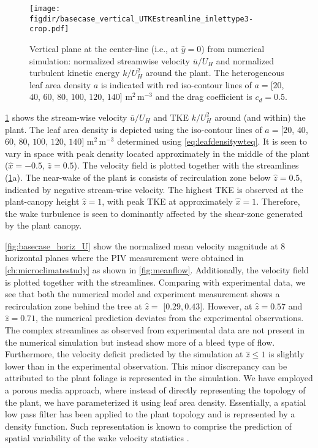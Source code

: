 	

\begin{figure}[h]
	\centering
	\texttt{[image: \\figdir/basecase\_vertical\_UTKEstreamline\_inlettype3-crop.pdf]}
	\caption{Vertical plane at the center-line (i.e., at $\hat{y}=0$) from numerical simulation:  normalized  streamwise velocity $\overline{u}/U_H$ and  normalized  turbulent kinetic energy $k/U_H^2$ around the plant. The heterogeneous leaf area density $a$ is indicated with red iso-contour lines of $a = [20$, $40$, $60$, $80$, $100$, $120$, $140]$ m$^2$\,m$^{-3}$ and the drag coefficient is $c_d=0.5$.}
	\label{fig:basecase_vertical_UTKEstreamline}
\end{figure}

\cref{fig:basecase_vertical_UTKEstreamline} shows the stream-wise velocity $\overline{u}/U_H$ and TKE $k/U_H^2$ around (and within) the plant. The leaf area density is depicted using the iso-contour lines of $a = [20$, $40$, $60$, $80$, $100$, $120$, $140]$ m$^2$\,m$^{-3}$ determined using \cref{eq:leafdensitywteq}. It is seen to vary in space with peak density located approximately in the middle of the plant ($\hat{x}=-0.5$, $\hat{z}=0.5$). The velocity field is plotted together with the streamlines (\cref{fig:basecase_vertical_UTKEstreamline}a). The near-wake of the plant is consists of recirculation zone below $\hat{z} = 0.5$, indicated by negative stream-wise velocity. The highest TKE is observed at the plant-canopy height $\hat{z} = 1$, with peak TKE at approximately $\hat{x} = 1$. Therefore, the wake turbulence is seen to dominantly affected by the shear-zone generated by the plant canopy.

\cref{fig:basecase_horiz_U} show the normalized mean velocity magnitude at 8 horizontal planes where the PIV measurement were obtained in \cref{ch:microclimatestudy} as shown in \cref{fig:meanflow}. Additionally, the velocity field is plotted together with the streamlines. Comparing with experimental data, we see that both the numerical model and experiment measurement shows a recirculation zone behind the tree at $\hat{z}=$ [$0.29$,\,$0.43$]. However, at $\hat{z}= 0.57$ and $\hat{z}=0.71$, the numerical prediction deviates from the experimental observations. The complex streamlines as observed from experimental data are not present in the numerical simulation but instead show more of a bleed type of flow. Furthermore, the velocity deficit predicted by the simulation at $\hat{z}\le 1$ is slightly lower than in the experimental observation. This minor discrepancy can be attributed to the plant foliage is represented in the simulation. We have employed a porous media approach, where instead of directly representing the topology of the plant, we have parameterized it using leaf area density. Essentially, a spatial low pass filter has been applied to the plant topology and is represented by a density function. Such representation is known to comprise the prediction of spatial variability of the wake velocity statistics \citep{Endalew2009}.  

